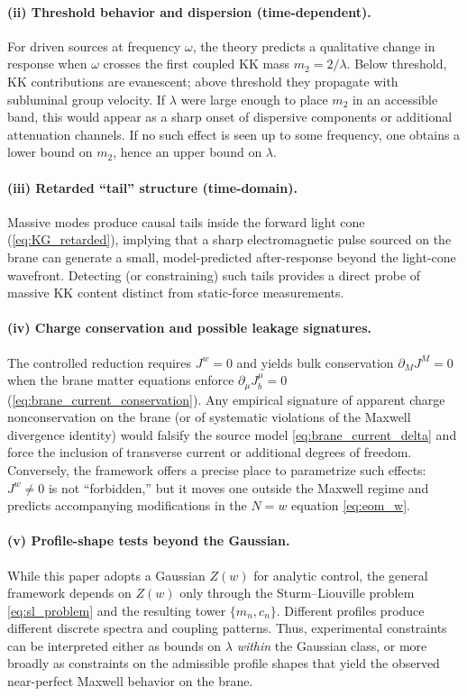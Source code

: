 \documentclass[11pt]{article}
\newcommand{\J}{J}
\newcommand{\Z}{Z}
\newcommand{\lam}{\lambda}      %
\begin{document}
\paragraph{(ii) Threshold behavior and dispersion (time-dependent).}
For driven sources at frequency \(\omega\), the theory predicts a qualitative
change in response when \(\omega\) crosses the first coupled KK mass \(m_2=2/\lam\).
Below threshold, KK contributions are evanescent; above threshold they propagate
with subluminal group velocity. If \(\lam\) were large enough to place \(m_2\) in
an accessible band, this would appear as a sharp onset of dispersive components or
additional attenuation channels. If no such effect is seen up to some frequency,
one obtains a lower bound on \(m_2\), hence an upper bound on \(\lam\).

\paragraph{(iii) Retarded ``tail'' structure (time-domain).}
Massive modes produce causal tails inside the forward light cone
(\cref{eq:KG_retarded}), implying that a sharp electromagnetic pulse sourced on
the brane can generate a small, model-predicted after-response beyond the
light-cone wavefront. Detecting (or constraining) such tails provides a direct
probe of massive KK content distinct from static-force measurements.

\paragraph{(iv) Charge conservation and possible leakage signatures.}
The controlled reduction requires \(\J^w=0\) and yields bulk conservation
\(\partial_M\J^M=0\) when the brane matter equations enforce
\(\partial_\mu \J_b^\mu=0\) (\cref{eq:brane_current_conservation}). Any empirical
signature of apparent charge nonconservation on the brane (or of systematic
violations of the Maxwell divergence identity) would falsify the source model
\cref{eq:brane_current_delta} and force the inclusion of transverse current or
additional degrees of freedom. Conversely, the framework offers a precise place
to parametrize such effects: \(\J^w\neq 0\) is not ``forbidden,'' but it moves one
outside the Maxwell regime and predicts accompanying modifications in the \(N=w\)
equation \cref{eq:eom_w}.

\paragraph{(v) Profile-shape tests beyond the Gaussian.}
While this paper adopts a Gaussian \(\Z(w)\) for analytic control, the general
framework depends on \(\Z(w)\) only through the Sturm--Liouville problem
\cref{eq:sl_problem} and the resulting tower \(\{m_n,c_n\}\). Different profiles
produce different discrete spectra and coupling patterns. Thus, experimental
constraints can be interpreted either as bounds on \(\lam\) \emph{within} the
Gaussian class, or more broadly as constraints on the admissible profile shapes
that yield the observed near-perfect Maxwell behavior on the brane.
\end{document}
